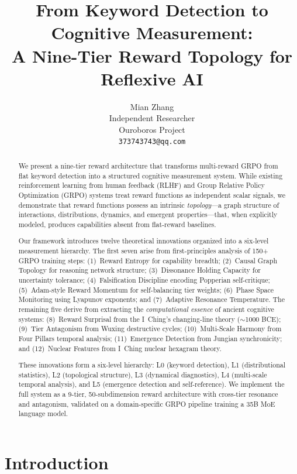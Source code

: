\documentclass{article}
\title{From Keyword Detection to Cognitive Measurement:\\
A Nine-Tier Reward Topology for Reflexive AI}
\author{
  Mian Zhang \\
  Independent Researcher \\
  Ouroboros Project \\
  \texttt{373743743@qq.com}
}
\begin{document}
\maketitle

\begin{abstract}
We present a nine-tier reward architecture that transforms multi-reward GRPO from flat keyword detection into a structured cognitive measurement system. While existing reinforcement learning from human feedback (RLHF) and Group Relative Policy Optimization (GRPO) systems treat reward functions as independent scalar signals, we demonstrate that reward functions possess an intrinsic \emph{topology}---a graph structure of interactions, distributions, dynamics, and emergent properties---that, when explicitly modeled, produces capabilities absent from flat-reward baselines.

Our framework introduces twelve theoretical innovations organized into a six-level measurement hierarchy. The first seven arise from first-principles analysis of 150+ GRPO training steps: (1)~Reward Entropy for capability breadth; (2)~Causal Graph Topology for reasoning network structure; (3)~Dissonance Holding Capacity for uncertainty tolerance; (4)~Falsification Discipline encoding Popperian self-critique; (5)~Adam-style Reward Momentum for self-balancing tier weights; (6)~Phase Space Monitoring using Lyapunov exponents; and (7)~Adaptive Resonance Temperature. The remaining five derive from extracting the \emph{computational essence} of ancient cognitive systems: (8)~Reward Surprisal from the I~Ching's changing-line theory ($\sim$1000 BCE); (9)~Tier Antagonism from Wuxing destructive cycles; (10)~Multi-Scale Harmony from Four Pillars temporal analysis; (11)~Emergence Detection from Jungian synchronicity; and (12)~Nuclear Features from I~Ching nuclear hexagram theory.

These innovations form a six-level hierarchy: L0 (keyword detection), L1 (distributional statistics), L2 (topological structure), L3 (dynamical diagnostics), L4 (multi-scale temporal analysis), and L5 (emergence detection and self-reference). We implement the full system as a 9-tier, 50-subdimension reward architecture with cross-tier resonance and antagonism, validated on a domain-specific GRPO pipeline training a 35B MoE language model.

\end{abstract}

\section{Introduction}
\end{document}
